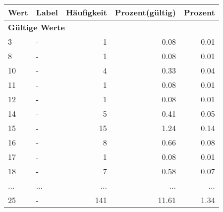      \begin{longtable}{lXrrr}
     \toprule
     \textbf{Wert} & \textbf{Label} & \textbf{Häufigkeit} & \textbf{Prozent(gültig)} & \textbf{Prozent} \\
     \endhead
     \midrule
     \multicolumn{5}{l}{\textbf{Gültige Werte}}\\
        3 & \multicolumn{1}{X}{-} & %
          \num{1} &
          \num[round-mode=places,round-precision=2]{0.08} &
          \num[round-mode=places,round-precision=2]{0.01} \\
        8 & \multicolumn{1}{X}{-} & %
          \num{1} &
          \num[round-mode=places,round-precision=2]{0.08} &
          \num[round-mode=places,round-precision=2]{0.01} \\
        10 & \multicolumn{1}{X}{-} & %
          \num{4} &
          \num[round-mode=places,round-precision=2]{0.33} &
          \num[round-mode=places,round-precision=2]{0.04} \\
        11 & \multicolumn{1}{X}{-} & %
          \num{1} &
          \num[round-mode=places,round-precision=2]{0.08} &
          \num[round-mode=places,round-precision=2]{0.01} \\
        12 & \multicolumn{1}{X}{-} & %
          \num{1} &
          \num[round-mode=places,round-precision=2]{0.08} &
          \num[round-mode=places,round-precision=2]{0.01} \\
        14 & \multicolumn{1}{X}{-} & %
          \num{5} &
          \num[round-mode=places,round-precision=2]{0.41} &
          \num[round-mode=places,round-precision=2]{0.05} \\
        15 & \multicolumn{1}{X}{-} & %
          \num{15} &
          \num[round-mode=places,round-precision=2]{1.24} &
          \num[round-mode=places,round-precision=2]{0.14} \\
        16 & \multicolumn{1}{X}{-} & %
          \num{8} &
          \num[round-mode=places,round-precision=2]{0.66} &
          \num[round-mode=places,round-precision=2]{0.08} \\
        17 & \multicolumn{1}{X}{-} & %
          \num{1} &
          \num[round-mode=places,round-precision=2]{0.08} &
          \num[round-mode=places,round-precision=2]{0.01} \\
        18 & \multicolumn{1}{X}{-} & %
          \num{7} &
          \num[round-mode=places,round-precision=2]{0.58} &
          \num[round-mode=places,round-precision=2]{0.07} \\
       ... & ... & ... & ... & ... \\
        25 & \multicolumn{1}{X}{-} & %
          \num{141} &
          \num[round-mode=places,round-precision=2]{11.61} &
          \num[round-mode=places,round-precision=2]{1.34} \\


\end{longtable}
